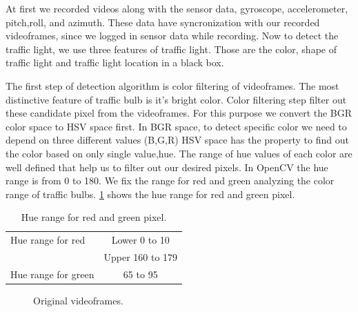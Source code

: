 At first we recorded videos along with the sensor data, gyroscope, accelerometer, pitch,roll, and azimuth.
These data have syncronization with our recorded videoframes, since we logged in sensor data while recording.
Now to detect the traffic light, we use three features of traffic light.
Those are the color, shape of traffic light and traffic light location in a black box.

The first step of detection algorithm is color filtering of videoframes.
The most distinctive feature of traffic bulb is it's bright color.
Color filtering step filter out these candidate pixel from the videoframes.
For this purpose we convert the BGR color space to HSV space first.
In BGR space, to detect specific color we need to depend on three different values (B,G,R)
HSV space has the property to find out the color based on only single value,hue.
The range of hue values of each color are well defined that help us to filter out our desired pixels.
In OpenCV the hue range is from 0 to 180.
We fix the range for red and green analyzing the color range of traffic bulbs.
\ref{t:hue_range} shows the hue range for red and green pixel.

\begin{table}[h!]
  \centering
  \caption{Hue range for red and green pixel.}
  \label{t:hue_range}
  \begin{tabular}{  l | c  }
    \hline
    Hue range for red & Lower 0 to 10 \\ \cline{2-2}
    & Upper 160 to 179 \\
    \hline \hline
    Hue range for green & 65 to 95 \\
    \hline
  \end{tabular}
\end{table}

\begin{figure}[!ht]
\centering
{}

\caption{Original videoframes.}
\label{f:org_img}
\end{figure}

